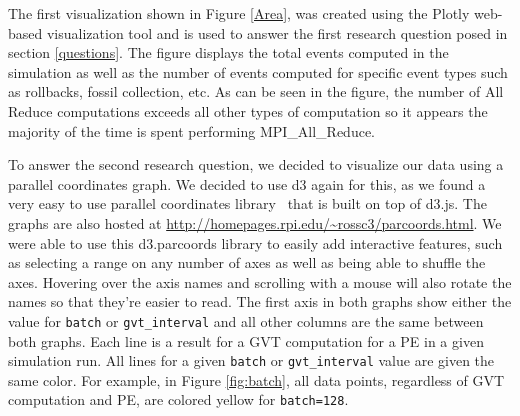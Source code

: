 \documentclass[12pt]{article}
\begin{document}
The first visualization shown in Figure \ref{Area}, was created using the Plotly \cite{Plotly} web-based visualization tool and is used to answer the first research question posed in section \ref{questions}. The figure displays the total events computed in the simulation as well as the number of events computed for specific event types such as rollbacks, fossil collection, etc. As can be seen in the figure, the number of All Reduce computations exceeds all other types of computation so it appears the majority of the time is spent performing MPI\_All\_Reduce. 

To answer the second research question, we decided to visualize our data using a parallel coordinates graph.  We decided to use d3 again for this, as we found a very easy to use parallel coordinates library~\cite{Chang} that is built on top of d3.js.  The graphs are also hosted at \url{http://homepages.rpi.edu/~rossc3/parcoords.html}. We were able to use this d3.parcoords library to easily add interactive features, such as selecting a range on any number of axes as well as being able to shuffle the axes. Hovering over the axis names and scrolling with a mouse will also rotate the names so that they're easier to read.  The first axis in both graphs show either the value for \texttt{batch} or \texttt{gvt\_interval} and all other columns are the same between both graphs.  Each line is a result for a GVT computation for a PE in a given simulation run.  All lines for a given \texttt{batch} or \texttt{gvt\_interval} value are given the same color.  For example, in Figure \ref{fig:batch}, all data points, regardless of GVT computation and PE, are colored yellow for \texttt{batch=128}.
\end{document}
